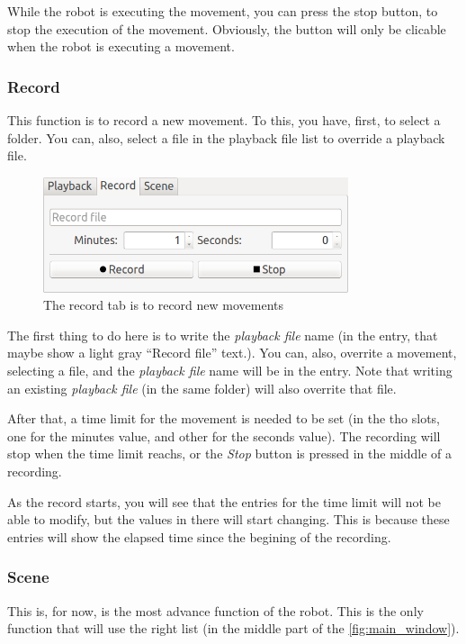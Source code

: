 \documentclass[oneside,a4paper,titlepage]{article}
\begin{document}
	While the robot is executing the movement, you can press the stop button, to stop the execution of the movement. Obviously, the button will only be clicable when the robot is executing a movement.
	
\subsubsection{Record}
\label{subsec:record}
	This function is to record a new movement. To this, you have, first, to select a folder. You can, also, select a file in the playback file list to override a playback file.
	
	\begin{figure}[h]
		\centering
		\includegraphics[width=0.8\textwidth]{record_tab}
		\caption[Record Tab]{The record tab is to record new movements}
		\label{fig:record_tab}
	\end{figure}
	
	The first thing to do here is to write the \emph{playback file} name (in the entry, that maybe show a light gray ``Record file'' text.). You can, also, overrite a movement, selecting a file, and the \emph{playback file} name will be in the entry. Note that writing an existing \emph{playback file} (in the same folder) will also overrite that file.
	
	After that, a time limit for the movement is needed to be set (in the tho slots, one for the minutes value, and other for the seconds value). The recording will stop when the time limit reachs, or the \emph{Stop} button is pressed in the middle of a recording.
	
	As the record starts, you will see that the entries for the time limit will not be able to modify, but the values in there will start changing. This is because these entries will show the elapsed time since the begining of the recording.
	
\subsubsection{Scene}
\label{subsec:scene}
	This is, for now, is the most advance function of the robot. This is the only function that will use the right list (in the middle part of the \ref{fig:main_window}).
\end{document}
